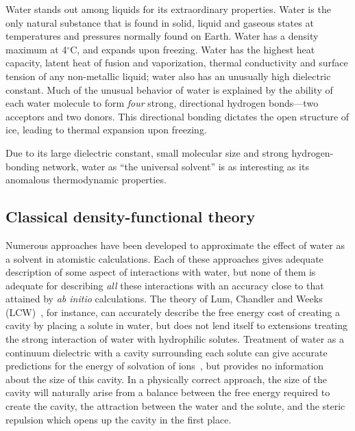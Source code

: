 \documentclass[letterpaper,twocolumn,amsmath,amssymb,prb]{revtex4-1}
\newcommand{\needsworknow}[1]{\textcolor{red}{[\emph{#1}]}}
\begin{document}
Water stands out among liquids for its extraordinary properties.
Water is the only natural substance that is found in solid, liquid and
gaseous states at temperatures and pressures normally found on Earth.
Water has a density maximum at 4$^\circ$C, and expands upon freezing.
Water has the highest heat capacity, latent heat of fusion and
vaporization, thermal conductivity and surface tension of any
non-metallic liquid;  water also has an unusually high dielectric constant.
Much of the unusual behavior of water is explained by the ability of
each water molecule to form \emph{four} strong, directional hydrogen
bonds---two acceptors and two donors.  This directional bonding
dictates the open structure of ice, leading to thermal expansion upon
freezing.

Due to its large dielectric constant, small molecular size and strong
hydrogen-bonding network, water as ``the universal solvent'' is as
interesting as its anomalous thermodynamic properties.

\subsection{Classical density-functional theory}


Numerous approaches have been developed to approximate the effect of water
as a solvent in atomistic calculations.  Each of these approaches gives
adequate description of some aspect of interactions with water, but none of
them is adequate for describing \emph{all} these interactions with an
accuracy close to that attained by \emph{ab initio} calculations.  The
theory of Lum, Chandler and Weeks (LCW)~\cite{lum1999hydrophobicity}, for 
instance, can
accurately describe the free energy cost of creating a cavity by placing a
solute in water, but does not lend itself to extensions treating the strong
interaction of water with hydrophilic solutes.  Treatment of water as a
continuum dielectric with a cavity surrounding each solute can give
accurate predictions for the energy of solvation of ions~\cite{latimer1939,
rashin1985, zhan1998, hsu1999, hildebrandt2004, hildebrandt2007}, but
provides no information about the size of this cavity.  In a physically
correct approach, the size of the cavity will naturally arise from a
balance between the free energy required to create the cavity, the
attraction between the water and the solute, and the steric repulsion which
opens up the cavity in the first place.
\end{document}

